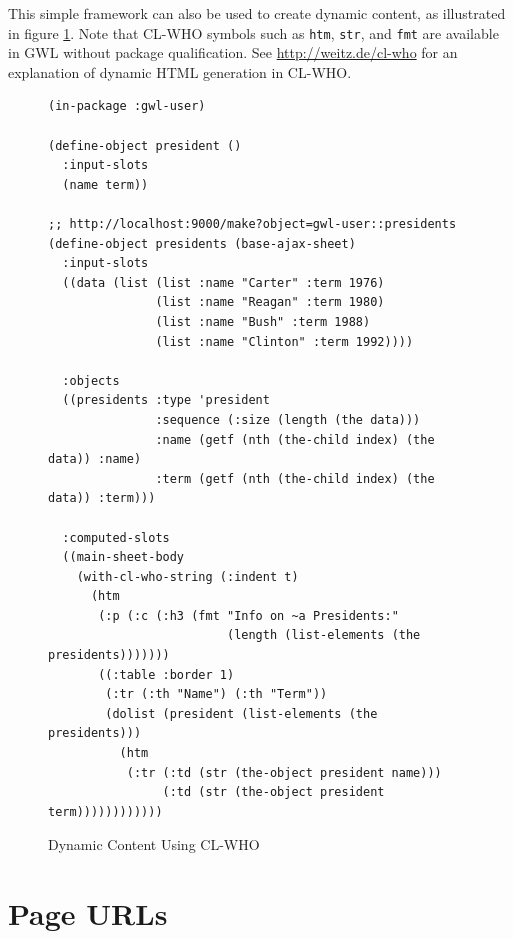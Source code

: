 \documentclass [11pt]{book}
\begin{document}
This simple framework can also be used to create dynamic content, as illustrated in figure 
\ref{fig:gwl-president-table}.
Note that CL-WHO symbols such as \texttt{htm}, \texttt{str}, and \texttt{fmt} are available in GWL without
package qualification. See \href{http://weitz.de/cl-who}{http://weitz.de/cl-who} for an explanation of
dynamic HTML generation in CL-WHO.
\begin{figure}
\begin{lrbox}{\boxedverb}
\begin{minipage}{\linewidth}
{\small

\begin{verbatim}(in-package :gwl-user)

(define-object president ()
  :input-slots
  (name term))

;; http://localhost:9000/make?object=gwl-user::presidents
(define-object presidents (base-ajax-sheet)
  :input-slots
  ((data (list (list :name "Carter" :term 1976)
               (list :name "Reagan" :term 1980)
               (list :name "Bush" :term 1988)
               (list :name "Clinton" :term 1992))))

  :objects
  ((presidents :type 'president
               :sequence (:size (length (the data)))
               :name (getf (nth (the-child index) (the data)) :name)
               :term (getf (nth (the-child index) (the data)) :term)))

  :computed-slots
  ((main-sheet-body
    (with-cl-who-string (:indent t)
      (htm
       (:p (:c (:h3 (fmt "Info on ~a Presidents:"
                         (length (list-elements (the presidents)))))))
       ((:table :border 1)
        (:tr (:th "Name") (:th "Term"))
        (dolist (president (list-elements (the presidents)))
          (htm      
           (:tr (:td (str (the-object president name)))
                (:td (str (the-object president term))))))))))))

\end{verbatim}}
\end{minipage}
\end{lrbox}
\fbox{\usebox{\boxedverb}}

\caption{Dynamic Content Using CL-WHO}

\label{fig:gwl-president-table}

\end{figure}




\section{Page URLs}
\end{document}
